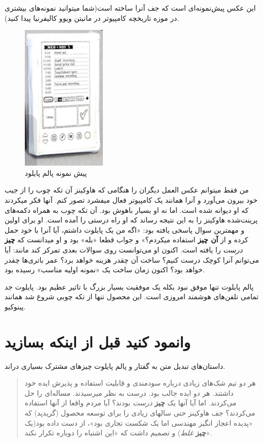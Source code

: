 این عکس پیش‌نمونه‌ای است که جف آنرا ساخته است(شما میتوانید نمونه‌های
بیشتری در موزه تاریخچه کامپیوتر در مانیتن ویوو کالیفرنیا پیدا کنید).

\begin{figure}[htbp]
\centering
\includegraphics{palmpilot.png}
\caption{پیش نمونه پالم پایلود}
\end{figure}

من فقط میتوانم عکس العمل دیگران را هنگامی که هاوکینز آن تکه چوب را از
جیب خود بیرون می‌آورد و آنرا همانند یک کامپیوتر فعال میفشرد تصور کنم.
آنها فکر میکردند که او دیوانه شده است. اما نه او بسیار باهوش بود. آن تکه
چوب به همراه دکمه‌های پرینت‌شده هاوکینز را به این نتیجه رساند که او راه
درستی را آمده است. او برای اولین و مهمترین سوال پاسخی یافته بود: «اگه من
یک پایلوت داشتم، آیا آنرا با خود حمل کرده و از \textbf{آن چیز} استفاده
میکردم؟» و جواب قطعا «بله» بود و او میدانست که \textbf{چیز} \emph{درست}
را یافته است. اکنون او می‌توانست روی سوالات بعدی تمرکز کند مانند: آیا
می‌توانم آنرا کوچک درست کنیم؟ ساخت آن چقدر هزینه خواهد برد؟ عمر باتری‌ها
چقدر خواهد بود؟ اکنون زمان ساخت یک «نمونه اولیه مناسب» رسیده بود.

پالم پایلوت تنها موفق نبود بکله یک موفقیت بسیار بزرگ با تاثیر عظیم بود.
پایلوت جد تمامی تلفن‌های هوشمند امروزی است. این محصول تنها از تکه چوبی
شروع شد همانند پینوکیو.

\section{وانمود کنید قبل از اینکه
بسازید}\label{ux648ux627ux646ux645ux648ux62f-ux6a9ux646ux6ccux62f-ux642ux628ux644-ux627ux632-ux627ux6ccux646ux6a9ux647-ux628ux633ux627ux632ux6ccux62f}

داستان‌های تبدیل متن به گفتار و پالم پایلوت چیزهای مشترک بسیاری دراند.

\begin{quote}
هر دو تیم شک‌های زیادی درباره سودمندی و قابلیت استفاده و پذیرش ایده خود
داشتند. هر دو ایده جالب بود. درست به نظر میرسیدند. مساله‌ای را حل
می‌کردند. اما آیا آنها یک \textbf{چیز} \emph{درست} بودند؟ آیا مردم واقعا
از آنها استفاده می‌کردند؟ جف هاوکینز حتی سالهای زیادی را برای توسعه
محصول (گریدپد) که «پدیده اعجاز انگیز مهندسی اما یک شکست تجاری بود»، از
دست داده بود(یک \textbf{چیز} \emph{غلط}) و تصمیم داشت که «این اشتباه را
دوباره تکرار نکند».
\end{quote}

